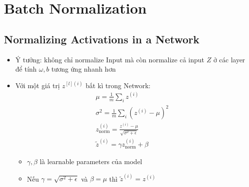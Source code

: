 \documentclass[12pt,a4paper]{report}
\begin{document}
	\section{Batch Normalization}
		\subsection{Normalizing Activations in a Network}
			\begin{itemize}
				\item Ý tưởng: không chỉ normalize Input mà còn normalize cả 
				input $Z$ ở các layer để tính $\omega, b $ tương ứng nhanh hơn
				\item Với một giá trị $ z^{[l](i)} $ bất kì trong Network:\\
				\begin{gather*}
					\mu = \frac{1}{m} \sum_{i} z^{(i)} \\
					\sigma^2 = \frac{1}{m} \sum_{i} (z^{(i)} - \mu)^2 \\
					z^{(i)}_{\text{norm}} = \frac{z^{(i)} - \mu}{\sqrt{\sigma ^2 + \epsilon}} \\
					\tilde{z}^{(i)} = \gamma z^{(i)}_{\text{norm}} + \beta
				\end{gather*}
				\begin{itemize}
					\item $ \gamma, \beta $ là learnable parameters của model
					\item Nếu $ \gamma = \sqrt{\sigma ^2 + \epsilon} $ và $ \beta = \mu $ thì $ \tilde{z}^{(i)} = z^{(i)} $
				\end{itemize}
			\end{itemize}
\end{document}
